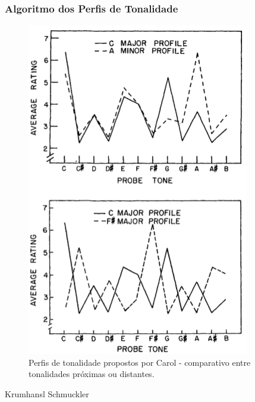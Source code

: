 \documentclass[
	12pt,				%
	openright,			%
	twoside,			%
	a4paper,			%
	english,			%
	french,				%
	spanish,			%
	brazil				%
	]{abntex2}
\begin{document}





\subsubsection{Algoritmo dos Perfis de Tonalidade}



\begin{figure}[!h]
	\caption{\label{fig_grafico}Perfis de tonalidade propostos por Carol  - comparativo entre tonalidades próximas ou distantes. }
	\begin{center}
	    \includegraphics[scale=0.6]{CBMS/probeones_krumhansl_p36.png}
	\end{center}
\end{figure}



 
Krumhansl Schmuckler 
\end{document}
